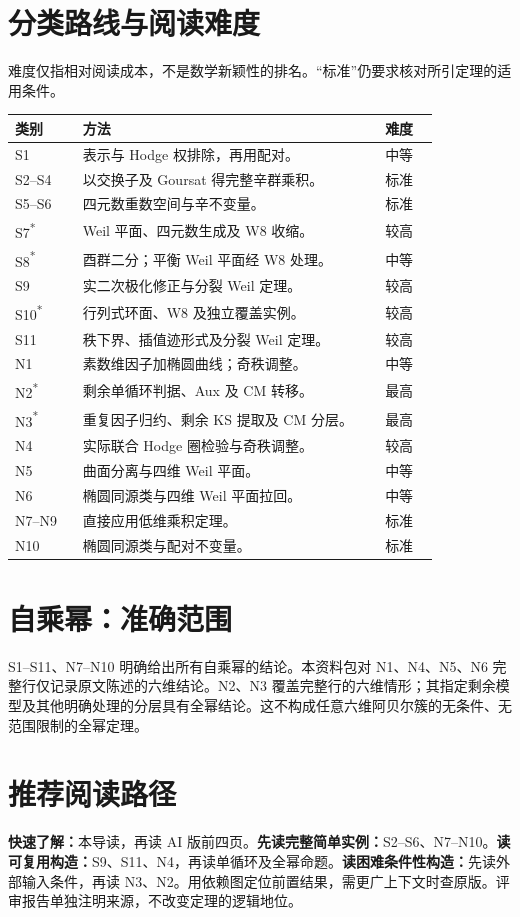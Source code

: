 \documentclass[10pt,a4paper]{article}
\newcommand{\external}{\textcolor{Warn}{\textsuperscript{*}}}
\begin{document}
\section*{分类路线与阅读难度}
难度仅指相对阅读成本，不是数学新颖性的排名。“标准”仍要求核对所引定理的适用条件。
\par\medskip\small\begin{tabular}{@{}p{0.15\linewidth}p{0.67\linewidth}p{0.12\linewidth}@{}}\toprule
类别 & 方法 & 难度\\\midrule
S1 & 表示与 Hodge 权排除，再用配对。 & 中等\\[4pt]
S2--S4 & 以交换子及 Goursat 得完整辛群乘积。 & 标准\\[4pt]
S5--S6 & 四元数重数空间与辛不变量。 & 标准\\[4pt]
S7\external & Weil 平面、四元数生成及 W8 收缩。 & 较高\\[4pt]
S8\external & 酉群二分；平衡 Weil 平面经 W8 处理。 & 中等\\[4pt]
S9 & 实二次极化修正与分裂 Weil 定理。 & 较高\\[4pt]
S10\external & 行列式环面、W8 及独立覆盖实例。 & 较高\\[4pt]
S11 & 秩下界、插值迹形式及分裂 Weil 定理。 & 较高\\[4pt]
N1 & 素数维因子加椭圆曲线；奇秩调整。 & 中等\\[4pt]
N2\external & 剩余单循环判据、Aux 及 CM 转移。 & 最高\\[4pt]
N3\external & 重复因子归约、剩余 KS 提取及 CM 分层。 & 最高\\[4pt]
N4 & 实际联合 Hodge 圈检验与奇秩调整。 & 较高\\[4pt]
N5 & 曲面分离与四维 Weil 平面。 & 中等\\[4pt]
N6 & 椭圆同源类与四维 Weil 平面拉回。 & 中等\\[4pt]
N7--N9 & 直接应用低维乘积定理。 & 标准\\[4pt]
N10 & 椭圆同源类与配对不变量。 & 标准\\[4pt]
\bottomrule\end{tabular}\par\normalsize
\section*{自乘幂：准确范围}
S1--S11、N7--N10 明确给出所有自乘幂的结论。本资料包对 N1、N4、N5、N6 完整行仅记录原文陈述的六维结论。N2、N3 覆盖完整行的六维情形；其指定剩余模型及其他明确处理的分层具有全幂结论。这不构成任意六维阿贝尔簇的无条件、无范围限制的全幂定理。
\section*{推荐阅读路径}
\textbf{快速了解：}本导读，再读 AI 版前四页。\textbf{先读完整简单实例：}S2--S6、N7--N10。\textbf{读可复用构造：}S9、S11、N4，再读单循环及全幂命题。\textbf{读困难条件性构造：}先读外部输入条件，再读 N3、N2。用依赖图定位前置结果，需更广上下文时查原版。评审报告单独注明来源，不改变定理的逻辑地位。
\end{document}
